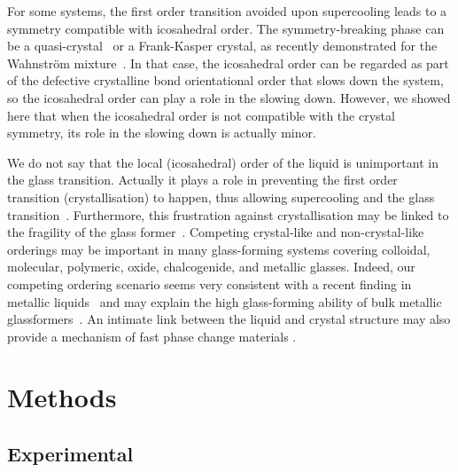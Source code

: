 For some systems, the first order transition avoided upon supercooling leads to a symmetry compatible with icosahedral order. The symmetry-breaking phase can be a quasi-crystal~\citep{Doye2003} or a Frank-Kasper crystal, as recently demonstrated for the Wahnstr\"om mixture~\citep{Pedersen2010}. In that case, the icosahedral order can be regarded as part of the defective crystalline bond orientational order that slows down the system, so the icosahedral order can play a role in the slowing down. However, we showed here that when the icosahedral order is not compatible with the crystal symmetry, its role in the slowing down is actually minor.

We do not say that the local (icosahedral) order of the liquid is unimportant in the glass transition. Actually it plays a role in preventing the first order transition (crystallisation) to happen, thus allowing supercooling and the glass transition~\cite{TanakaMJPCM}. Furthermore, this frustration against crystallisation may be linked to the fragility of the glass former~\citep{TanakaGJPCM,tanaka2010critical}. Competing crystal-like and non-crystal-like orderings may be important in many glass-forming systems covering colloidal, molecular, polymeric, oxide, chalcogenide, and metallic glasses. Indeed, our competing ordering scenario seems very consistent with a recent finding in metallic liquids~\cite{liu2010metallic} and may explain the high glass-forming ability of bulk metallic glassformers~\cite{Wang2004}. An intimate link between the liquid and crystal structure may also provide a mechanism of fast phase change materials \cite{wuttig2007phase}.

\section*{Methods}

\subsection*{Experimental}

